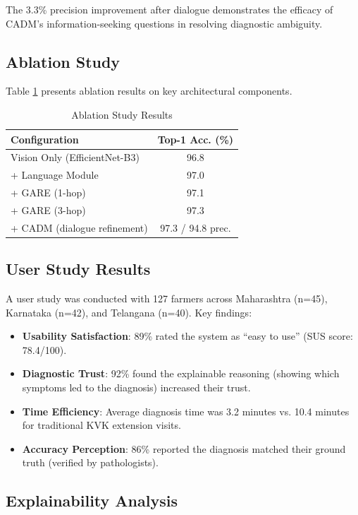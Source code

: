 \documentclass[conference]{IEEEtran}
\begin{document}
The 3.3\% precision improvement after dialogue demonstrates the efficacy of CADM's information-seeking questions in resolving diagnostic ambiguity.

\subsection{Ablation Study}

Table \ref{tab:ablation} presents ablation results on key architectural components.

\begin{table}[htbp]
\caption{Ablation Study Results}
\label{tab:ablation}
\centering
\begin{tabular}{lc}
\toprule
\textbf{Configuration} & \textbf{Top-1 Acc. (\%)} \\
\midrule
Vision Only (EfficientNet-B3) & 96.8 \\
+ Language Module & 97.0 \\
+ GARE (1-hop) & 97.1 \\
+ GARE (3-hop) & 97.3 \\
+ CADM (dialogue refinement) & 97.3 / 94.8 prec. \\
\bottomrule
\end{tabular}
\end{table}

\subsection{User Study Results}

A user study was conducted with 127 farmers across Maharashtra (n=45), Karnataka (n=42), and Telangana (n=40). Key findings:

\begin{itemize}
    \item \textbf{Usability Satisfaction}: 89\% rated the system as ``easy to use'' (SUS score: 78.4/100).
    \item \textbf{Diagnostic Trust}: 92\% found the explainable reasoning (showing which symptoms led to the diagnosis) increased their trust.
    \item \textbf{Time Efficiency}: Average diagnosis time was 3.2 minutes vs. 10.4 minutes for traditional KVK extension visits.
    \item \textbf{Accuracy Perception}: 86\% reported the diagnosis matched their ground truth (verified by pathologists).
\end{itemize}

\subsection{Explainability Analysis}
\end{document}
